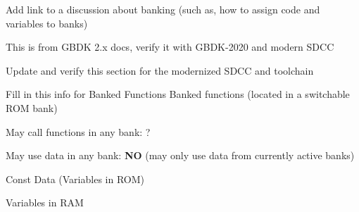 
\begin{DoxyRefList}
\item[File \mbox{\hyperlink{far__ptr_8h}{far\+\_\+ptr.h}} ]\label{todo__todo000001}%
%
Add link to a discussion about banking (such as, how to assign code and variables to banks)  
\item[Page \mbox{\hyperlink{docs_using_gbdk}{Using G\+B\+DK}} ]\label{todo__todo000002}%
%
This is from G\+B\+DK 2.\+x docs, verify it with G\+B\+D\+K-\/2020 and modern S\+D\+CC 
\item[Page \mbox{\hyperlink{docs_coding_guidelines}{Coding Guidelines}} ]\label{todo__todo000003}%
%
Update and verify this section for the modernized S\+D\+CC and toolchain 
\item[Page \mbox{\hyperlink{docs_rombanking_mbcs}{R\+O\+M/\+R\+AM Banking and M\+B\+Cs}} ]\label{todo__todo000004}%
%
Fill in this info for Banked Functions Banked functions (located in a switchable R\+OM bank)
\begin{DoxyItemize}
\item May call functions in any bank\+: ?
\item May use data in any bank\+: {\bfseries{NO}} (may only use data from currently active banks)
\end{DoxyItemize}

\label{todo__todo000005}%
%
Const Data (Variables in R\+OM)

\label{todo__todo000006}%
%
Variables in R\+AM
\end{DoxyRefList}